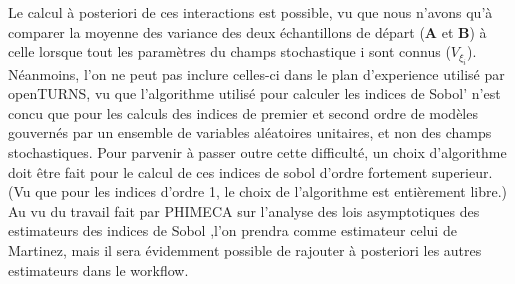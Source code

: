 \documentclass[a4paper,10pt]{article}
\begin{document}
Le calcul à posteriori de ces interactions est possible, vu que nous n'avons qu'à comparer la moyenne des variance des deux échantillons de départ (\textbf{A} et \textbf{B}) à celle lorsque tout les paramètres du champs stochastique i sont connus ($V_{\xi_{i}}$). \\

Néanmoins, l'on ne peut pas inclure celles-ci dans le plan d'experience utilisé par openTURNS, vu que l'algorithme utilisé pour calculer les indices de Sobol' n'est concu que pour les calculs des indices de premier et second ordre de modèles gouvernés par un ensemble de variables aléatoires unitaires, et non des champs stochastiques. Pour parvenir à passer outre cette difficulté, un choix d'algorithme doit être fait pour le calcul de ces indices de sobol d'ordre fortement superieur. (Vu que pour les indices d'ordre 1, le choix de l'algorithme est entièrement libre.) Au vu du travail fait par PHIMECA sur l'analyse des lois asymptotiques des estimateurs des indices de Sobol \cite{dumas2017} ,l'on prendra comme estimateur celui de Martinez, mais il sera évidemment possible de rajouter à posteriori les autres estimateurs dans le workflow. \\ 
\end{document}
